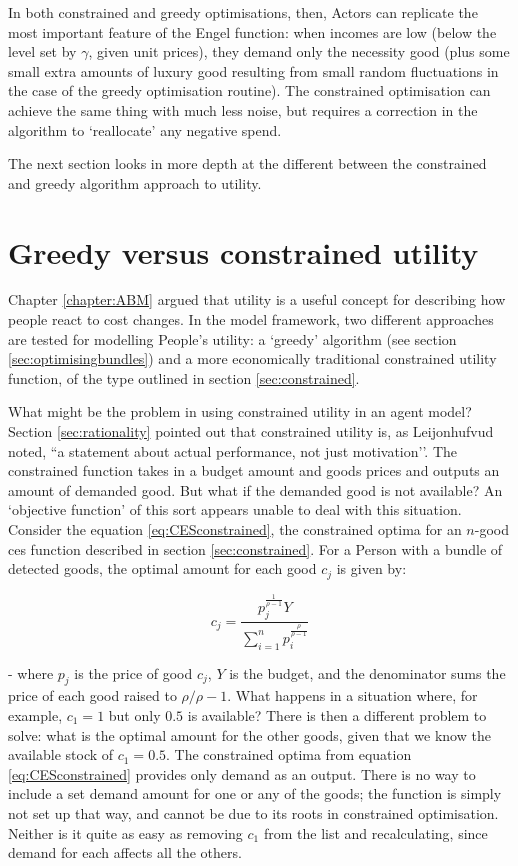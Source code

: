 In both constrained and greedy optimisations, then, Actors can replicate the most important feature of the Engel function: when incomes are low (below the level set by $\gamma$, given unit prices), they demand only the necessity good (plus some small extra amounts of luxury good resulting from small random fluctuations in the case of the greedy optimisation routine). The constrained optimisation can achieve the same thing with much less noise, but requires a correction in the algorithm to `reallocate’ any negative spend.

The next section looks in more depth at the different between the constrained and greedy algorithm approach to utility.

\section{Greedy versus constrained utility \label{sec:greedyvsconstrained}}

Chapter \ref{chapter:ABM} argued that utility is a useful concept for describing how people react to cost changes. In the model framework, two different approaches are tested for modelling People’s utility: a `greedy’ algorithm (see section \ref{sec:optimisingbundles}) and a more economically traditional constrained utility function, of the type outlined in section \ref{sec:constrained}.

What might be the problem in using constrained utility in an agent model? Section \ref{sec:rationality} pointed out that constrained utility is, as Leijonhufvud noted, ``a statement about actual performance, not just motivation’’. The constrained function takes in a budget amount and goods prices and outputs an amount of demanded good. But what if the demanded good is not available? An `objective function’ of this sort appears unable to deal with this situation. Consider the equation \eqref{eq:CESconstrained}, the constrained optima for an $n$-good \gls{ces} function described in section \ref{sec:constrained}. For a Person with a bundle of detected goods, the optimal amount for each good $c_j$ is given by:

\begin{equation}
c_j = \frac{p_j^\frac{1}{\rho-1}Y}{\sum_{i=1}^{n}p_i^\frac{\rho}{\rho-1}} \label{eq:CESconstrained2}
\end{equation}

 - where $p_j$ is the price of good $c_j$, $Y$ is the budget, and the denominator sums the price of each good raised to $\rho/\rho-1$. What happens in a situation where, for example, $c_1 = 1$ but only $0.5$ is available? There is then a different problem to solve: what is the optimal amount for the other goods, given that we know the available stock of  $c_1 = 0.5$. The constrained optima from equation \eqref{eq:CESconstrained} provides only demand as an output. There is no way to include a set demand amount for one or any of the goods; the function is simply not set up that way, and cannot be due to its roots in constrained optimisation. Neither is it quite as easy as removing $c_1$ from the list and recalculating, since demand for each affects all the others.

